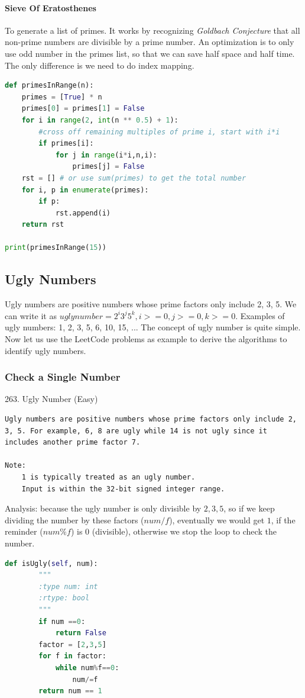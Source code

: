 \documentclass[../main.tex]{subfiles}
\begin{document}
\paragraph{Sieve Of Eratosthenes} To  generate a list of primes. It works by recognizing \textit{Goldbach Conjecture} that all non-prime numbers are divisible by a prime number. An optimization is to only use odd number in the primes list, so that we can save half space and half time. The only difference is we need to do index mapping.
\begin{lstlisting}[language=Python]
def primesInRange(n):
    primes = [True] * n
    primes[0] = primes[1] = False
    for i in range(2, int(n ** 0.5) + 1):
        #cross off remaining multiples of prime i, start with i*i
        if primes[i]:
            for j in range(i*i,n,i):
                primes[j] = False  
    rst = [] # or use sum(primes) to get the total number
    for i, p in enumerate(primes):
        if p:
            rst.append(i)
    return rst
    
print(primesInRange(15))
\end{lstlisting}
\subsection{Ugly Numbers}
Ugly numbers are positive numbers whose prime factors only include 2, 3, 5. We can write it as $ugly number = 2^i3^j5^k, i>=0, j>=0, k>=0$. Examples of ugly numbers: 1, 2, 3, 5, 6, 10, 15, ... The concept of ugly number is quite simple. Now let us use the LeetCode problems as example to derive the algorithms to identify ugly numbers.
\subsubsection{Check a Single Number}
263. Ugly Number (Easy)
\begin{lstlisting}
Ugly numbers are positive numbers whose prime factors only include 2, 3, 5. For example, 6, 8 are ugly while 14 is not ugly since it includes another prime factor 7.

Note:
    1 is typically treated as an ugly number.
    Input is within the 32-bit signed integer range.
\end{lstlisting}
Analysis: because the ugly number is only divisible by $2, 3, 5$, so if we keep dividing the number by these factors ($num/f$), eventually we would get $1$, if the reminder ($num\%f$) is $0$ (divisible), otherwise we stop the loop to check the number. 
\begin{lstlisting}[language = Python]
def isUgly(self, num):
        """
        :type num: int
        :rtype: bool
        """
        if num ==0:
            return False
        factor = [2,3,5]
        for f in factor:
            while num%f==0:
                num/=f
        return num == 1
\end{lstlisting}
\end{document}
